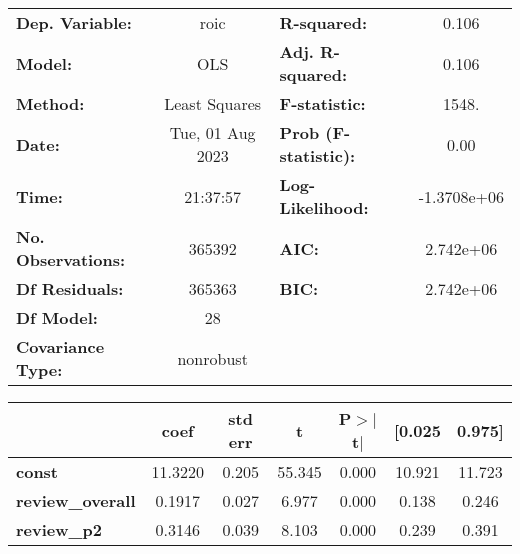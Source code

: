 \begin{center}
\begin{tabular}{lclc}
\toprule
\textbf{Dep. Variable:}                                               &       roic       & \textbf{  R-squared:         } &      0.106   \\
\textbf{Model:}                                                       &       OLS        & \textbf{  Adj. R-squared:    } &      0.106   \\
\textbf{Method:}                                                      &  Least Squares   & \textbf{  F-statistic:       } &      1548.   \\
\textbf{Date:}                                                        & Tue, 01 Aug 2023 & \textbf{  Prob (F-statistic):} &      0.00    \\
\textbf{Time:}                                                        &     21:37:57     & \textbf{  Log-Likelihood:    } & -1.3708e+06  \\
\textbf{No. Observations:}                                            &      365392      & \textbf{  AIC:               } &  2.742e+06   \\
\textbf{Df Residuals:}                                                &      365363      & \textbf{  BIC:               } &  2.742e+06   \\
\textbf{Df Model:}                                                    &          28      & \textbf{                     } &              \\
\textbf{Covariance Type:}                                             &    nonrobust     & \textbf{                     } &              \\
\bottomrule
\end{tabular}
\begin{tabular}{lcccccc}
                                                                      & \textbf{coef} & \textbf{std err} & \textbf{t} & \textbf{P$> |$t$|$} & \textbf{[0.025} & \textbf{0.975]}  \\
\midrule
\textbf{const}                                                        &      11.3220  &        0.205     &    55.345  &         0.000        &       10.921    &       11.723     \\
\textbf{review\_overall}                                              &       0.1917  &        0.027     &     6.977  &         0.000        &        0.138    &        0.246     \\
\textbf{review\_p2}                                                   &       0.3146  &        0.039     &     8.103  &         0.000        &        0.239    &        0.391     \\

\end{tabular}
\end{center}
